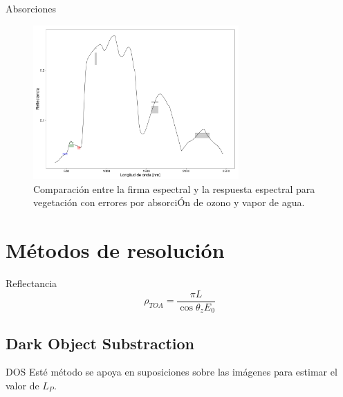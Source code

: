 \documentclass[]{beamer}
\begin{document}
\begin{frame}{Absorciones}
  \begin{figure}
  \centering
  \includegraphics[width=0.7\textwidth]{imagenes/abs_veg_esp.png}
  \caption{Comparación entre la firma espectral y la respuesta espectral para vegetación con errores por absorciÓn de ozono y vapor de agua.}
  \end{figure}
\end{frame}

\section{Métodos de resolución}
\begin{frame}{Reflectancia}
  \begin{equation}
    \rho_{TOA} = \frac{\pi L}{\cos \theta_z E_0}
  \end{equation}
\end{frame}

\subsection{Dark Object Substraction}
\begin{frame}{DOS}
  Esté método se apoya en suposiciones sobre las imágenes para estimar el valor de $L_P$.
\end{frame}
\end{document}
